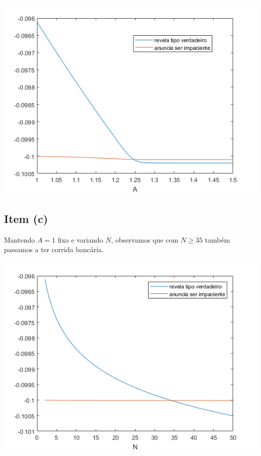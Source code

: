 \documentclass{article}
\begin{document}
\includegraphics[scale=0.6]{Ex1/ex2_1.png}

\subsection*{Item (c)}

Mantendo $A = 1$ fixo e variando $N$, observamos que com $N \geq 35$ também
passamos a ter corrida bancária.

\includegraphics[scale=0.6]{Ex1/ex2_2.png}
\end{document}

